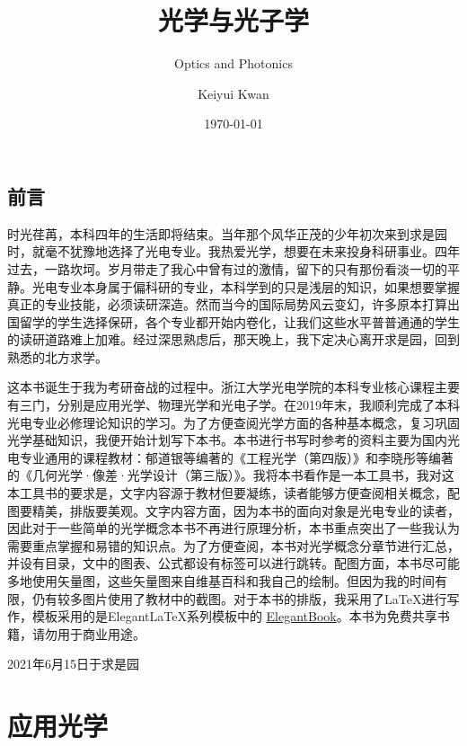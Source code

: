 \documentclass[cn,10pt,chinesefont=founder,math=mtpro2,cite=super,toc=onecol,twoside,openany]{elegantbook}
\title{光学与光子学}
\subtitle{\huge{Optics and Photonics}}
\author{Keiyui Kwan}
\institute{Zhejiang University}
\date{\today}
\begin{document}
	
\maketitle
\frontmatter

\chapter*{前\hspace{1em}言}

时光荏苒，本科四年的生活即将结束。当年那个风华正茂的少年初次来到求是园时，就毫不犹豫地选择了光电专业。我热爱光学，想要在未来投身科研事业。四年过去，一路坎坷。岁月带走了我心中曾有过的激情，留下的只有那份看淡一切的平静。光电专业本身属于偏科研的专业，本科学到的只是浅层的知识，如果想要掌握真正的专业技能，必须读研深造。然而当今的国际局势风云变幻，许多原本打算出国留学的学生选择保研，各个专业都开始内卷化，让我们这些水平普普通通的学生的读研道路难上加难。经过深思熟虑后，那天晚上，我下定决心离开求是园，回到熟悉的北方求学。

这本书诞生于我为考研奋战的过程中。浙江大学光电学院的本科专业核心课程主要有三门，分别是应用光学、物理光学和光电子学。在2019年末，我顺利完成了本科光电专业必修理论知识的学习。为了方便查阅光学方面的各种基本概念，复习巩固光学基础知识，我便开始计划写下本书。本书进行书写时参考的资料主要为国内光电专业通用的课程教材：郁道银等编著的《工程光学（第四版）》和李晓彤等编著的《几何光学·像差·光学设计（第三版）》。我将本书看作是一本工具书，我对这本工具书的要求是，文字内容源于教材但要凝练，读者能够方便查阅相关概念，配图要精美，排版要美观。文字内容方面，因为本书的面向对象是光电专业的读者，因此对于一些简单的光学概念本书不再进行原理分析，本书重点突出了一些我认为需要重点掌握和易错的知识点。为了方便查阅，本书对光学概念分章节进行汇总，并设有目录，文中的图表、公式都设有标签可以进行跳转。配图方面，本书尽可能多地使用矢量图，这些矢量图来自维基百科和我自己的绘制。但因为我的时间有限，仍有较多图片使用了教材中的截图。对于本书的排版，我采用了\LaTeX 进行写作，模板采用的是Elegant\LaTeX 系列模板中的 \href{https://github.com/ElegantLaTeX/ElegantBook}{ElegantBook}。本书为免费共享书籍，请勿用于商业用途。

\begin{flushright}
	{}
	\par 2021年6月15日于求是园
\end{flushright}

\tableofcontents

\mainmatter

\part{应用光学}
\end{document}
